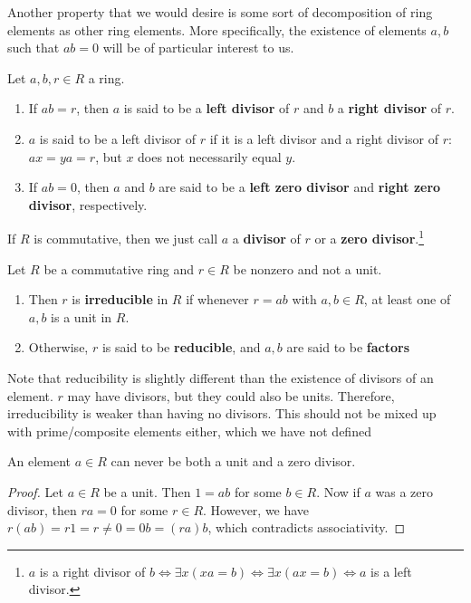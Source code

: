   Another property that we would desire is some sort of decomposition of ring elements as other ring elements. More specifically, the existence of elements $a, b$ such that $ab = 0$ will be of particular interest to us. 

  \begin{definition}
    Let $a, b, r \in R$ a ring. 
    \begin{enumerate}
      \item If $ab = r$, then $a$ is said to be a \textbf{left divisor} of $r$ and $b$ a \textbf{right divisor} of $r$. 

      \item $a$ is said to be a left divisor of $r$ if it is a left divisor and a right divisor of $r$: $ax = ya = r$, but $x$ does not necessarily equal $y$. 

      \item If $ab = 0$, then $a$ and $b$ are said to be a \textbf{left zero divisor} and \textbf{right zero divisor}, respectively. 
    \end{enumerate}
    If $R$ is commutative, then we just call $a$ a \textbf{divisor} of $r$ or a \textbf{zero divisor}.\footnote{$a$ is a right divisor of $b \iff \exists x (xa = b) \iff \exists x (ax = b) \iff a$ is a left divisor. } 
  \end{definition}

  \begin{definition}
    Let $R$ be a commutative ring and $r \in R$ be nonzero and not a unit. 
    \begin{enumerate}
      \item Then $r$ is \textbf{irreducible} in $R$ if whenever $r = ab$ with $a, b \in R$, at least one of $a, b$ is a unit in $R$. 
      \item Otherwise, $r$ is said to be \textbf{reducible}, and $a, b$ are said to be \textbf{factors}
    \end{enumerate}
  \end{definition}
  
  Note that reducibility is slightly different than the existence of divisors of an element. $r$ may have divisors, but they could also be units. Therefore, irreducibility is weaker than having no divisors. This should not be mixed up with prime/composite elements either, which we have not defined 

  \begin{lemma}
    An element $a \in R$ can never be both a unit and a zero divisor. 
  \end{lemma}
  \begin{proof}
    Let $a \in R$ be a unit. Then $1 = ab$ for some $b \in R$. Now if $a$ was a zero divisor, then $ra = 0$ for some $r \in R$. However, we have $r(ab) = r1 = r \neq 0 = 0b = (ra)b$, which contradicts associativity. 
  \end{proof}

